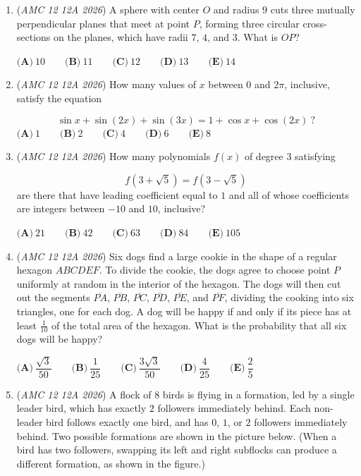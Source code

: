 \begin{enumerate}
 $\textbf{(A)}\   6  \qquad 	\textbf{(B)}\   8  \qquad 	\textbf{(C)}\   9  \qquad 	\textbf{(D)}\   10  \qquad 	\textbf{(E)}\   12$


	\item (\textit{AMC 12 12A 2026}) A sphere with center $O$ and radius $9$ cuts three mutually perpendicular planes that meet at point $P$, forming three circular cross-sections on the planes, which have radii $7$, $4$, and $3$. What is $OP$?


 $\textbf{(A)}\   10  \qquad 	\textbf{(B)}\   11  \qquad 	\textbf{(C)}\   12  \qquad 	\textbf{(D)}\   13  \qquad 	\textbf{(E)}\   14$


	\item (\textit{AMC 12 12A 2026}) How many values of $x$ between $0$ and $2\pi$, inclusive, satisfy the equation

 \[\sin x + \sin(2x) + \sin(3x) = 1 + \cos x + \cos(2x)\ ?\]
$\textbf{(A)}\   1  \qquad 	\textbf{(B)}\   2  \qquad 	\textbf{(C)}\   4  \qquad 	\textbf{(D)}\   6  \qquad 	\textbf{(E)}\   8$


	\item (\textit{AMC 12 12A 2026}) How many polynomials $f(x)$ of degree $3$ satisfying

 \[f\left( 3+\sqrt{5} \right) = f\left( 3 - \sqrt{5} \right)\]
are there that have leading coefficient equal to $1$ and all of whose coefficients are integers between $-10$ and $10$, inclusive?


 $\textbf{(A)}\   21  \qquad 	\textbf{(B)}\   42  \qquad 	\textbf{(C)}\   63  \qquad 	\textbf{(D)}\   84  \qquad 	\textbf{(E)}\   105$


	\item (\textit{AMC 12 12A 2026}) Six dogs find a large cookie in the shape of a regular hexagon $ABCDEF$. To divide the cookie, the dogs agree to choose point $P$ uniformly at random in the interior of the hexagon. The dogs will then cut out the segments $\overline{PA}$, $\overline{PB}$, $\overline{PC}$, $\overline{PD}$, $\overline{PE}$, and $\overline{PF}$, dividing the cooking into six triangles, one for each dog. A dog will be happy if and only if its piece has at least $\frac{1}{10}$ of the total area of the hexagon. What is the probability that all six dogs will be happy?


 $\textbf{(A)}\   \dfrac{\sqrt{3}}{50}  \qquad 	\textbf{(B)}\   \dfrac{1}{25}  \qquad 	\textbf{(C)}\   \dfrac{3\sqrt{3}}{50}  \qquad 	\textbf{(D)}\   \dfrac{4}{25}  \qquad 	\textbf{(E)}\   \dfrac{2}{5}$


	\item (\textit{AMC 12 12A 2026}) A flock of $8$ birds is flying in a formation, led by a single leader bird, which has exactly $2$ followers immediately behind. Each non-leader bird follows exactly one bird, and has $0$, $1$, or $2$ followers immediately behind. Two possible formations are shown in the picture below. (When a bird has two followers, swapping its left and right subflocks can produce a different formation, as shown in the figure.)



\end{enumerate}
